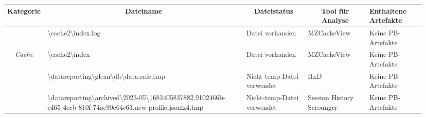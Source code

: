\begin{appendices}
{\begin{landscape}
\begin{table}[h!]
{\begin{tabular}{cllll}
	\multicolumn{1}{|c|}{\textbf{Kategorie}}                                                                     & \multicolumn{1}{c|}{\textbf{Dateiname}}                                                                                                                                                                             & \multicolumn{1}{c|}{\textbf{Dateistatus}}                                                         & \multicolumn{1}{c|}{\textbf{Tool für Analyse}}   & \multicolumn{1}{l|}{\textbf{Enthaltene Artefakte}}              \\ \hline
	\multicolumn{1}{|c|}{}                                                                                       & \multicolumn{1}{l|}{\cellcolor[HTML]{34CDF9}\textbackslash{}cache2\textbackslash{}index.log}                                                                                                                        & \multicolumn{1}{l|}{\cellcolor[HTML]{009901}Datei vorhanden}                                      & \multicolumn{1}{l|}{MZCacheView}            & \multicolumn{1}{l|}{\cellcolor[HTML]{F8A102}Keine PB-Artefakte} \\ \cline{2-5} 
	\multicolumn{1}{|c|}{\multirow{-2}{*}{\textit{Cache}}}                                                       & \multicolumn{1}{l|}{\cellcolor[HTML]{34CDF9}\textbackslash{}cache2\textbackslash{}index}                                                                                                                            & \multicolumn{1}{l|}{\cellcolor[HTML]{009901}Datei vorhanden}                                      & \multicolumn{1}{l|}{MZCacheView}            & \multicolumn{1}{l|}{\cellcolor[HTML]{F8A102}Keine PB-Artefakte} \\ \hline
	\multicolumn{1}{|c|}{}                                                                                       & \multicolumn{1}{l|}{\cellcolor[HTML]{3190FF}\textbackslash{}datareporting\textbackslash{}glean\textbackslash{}db\textbackslash{}data.safe.tmp}                                                                      & \multicolumn{1}{l|}{\cellcolor[HTML]{FCFF2F}Nicht-temp-Datei verwendet}                           & \multicolumn{1}{l|}{HxD}                         & \multicolumn{1}{l|}{\cellcolor[HTML]{F8A102}Keine PB-Artefakte} \\ \cline{2-5} 
	\multicolumn{1}{|c|}{}                                                                                       & \multicolumn{1}{l|}{\cellcolor[HTML]{3190FF}\textbackslash{}datareporting\textbackslash{}archived\textbackslash{}2023-05\textbackslash{}1683405837882.9102466b-e465-4ecb-810f-74ae90c64c63.new-profile.jsonlz4.tmp} & \multicolumn{1}{l|}{\cellcolor[HTML]{FCFF2F}Nicht-temp-Datei verwendet}                           & \multicolumn{1}{l|}{Session History Scrounger}   & \multicolumn{1}{l|}{\cellcolor[HTML]{F8A102}Keine PB-Artefakte} \\ \cline{2-5} 

\end{tabular}}
\end{table}
\end{landscape}}
\end{appendices}
